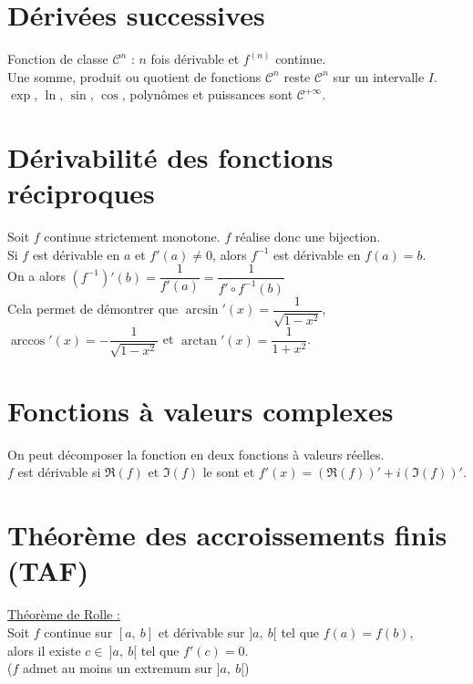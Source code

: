 \section{Dérivées successives}\label{sec:deriv-es-successives}

    Fonction de classe $\mathcal{C}^n$ : $n$ fois dérivable et $f^{(n)}$ continue.\\
    Une somme, produit ou quotient de fonctions $\mathcal{C}^n$ reste $\mathcal{C}^n$ sur un intervalle $I$.\\
    $\exp$, $\ln$, $\sin$, $\cos$, polynômes et puissances sont $\mathcal{C}^{+\infty}$.


\section{Dérivabilité des fonctions réciproques}\label{sec:derivabilite-des-fonctions-reciproques}

    Soit $f$ continue strictement monotone. $f$ réalise donc une bijection.\\

    Si $f$ est dérivable en $a$ et $f'(a) \neq 0$, alors $f^{-1}$ est dérivable en $f(a) = b$.\\

    On a alors $(f^{-1})'(b) = \dfrac{1}{f'(a)} = \dfrac{1}{f' \circ f^{-1}(b)}$\\

    Cela permet de démontrer que $\arcsin'(x) = \dfrac{1}{\sqrt{1 - x^2}}$, $\arccos'(x) = -\dfrac{1}{\sqrt{1 - x^2}}$ et $\arctan'(x) = \dfrac{1}{1 + x^2}$.


\section{Fonctions à valeurs complexes}\label{sec:fonctions-a-valeurs-complexes}

    On peut décomposer la fonction en deux fonctions à valeurs réelles.
    \vspace{3pt}\\
    $f$ est dérivable si $\Re(f)$ et $\Im(f)$ le sont et $f'(x) = (\Re(f))' + i (\Im(f))'$.


\section{Théorème des accroissements finis (TAF)}\label{sec:theoreme-des-accroissements-finis-(taf)}

    \underline{Théorème de Rolle :}\\
    Soit $f$ continue sur $[a,\ b]$ et dérivable sur $]a,\ b[$ tel que $f(a) = f(b)$,\\
    alors il existe $c \in\ ]a,\ b[$ tel que $f'(c) = 0$.\\
    ($f$ admet au moins un extremum sur $]a,\ b[$)\\

